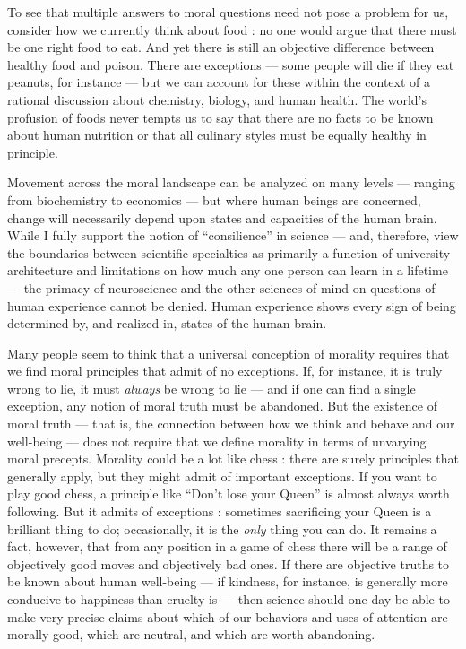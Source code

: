 \documentclass[a4paper,14pt]{extbook}
\begin{document}
To see that multiple answers to moral questions need not pose a problem for us, consider how we currently think about food :
no one would argue that there must be one right food to eat.
And yet there is still an objective difference between healthy food and poison.
There are exceptions --- some people will die if they eat peanuts, for instance --- but we can account for these within the context of a rational discussion about chemistry, biology, and human health.
The world's profusion of foods never tempts us to say that there are no facts to be known about human nutrition or that all culinary styles must be equally healthy in principle.

Movement across the moral landscape can be analyzed on many levels --- ranging from biochemistry to economics --- but where human beings are concerned, change will necessarily depend upon states and capacities of the human brain.
While I fully support the notion of ``consilience'' in science --- and, therefore, view the boundaries between scientific specialties as primarily a function of university architecture and limitations on how much any one person can learn in a lifetime --- the primacy of neuroscience and the other sciences of mind on questions of human experience cannot be denied.
Human experience shows every sign of being determined by, and realized in, states of the human brain.

Many people seem to think that a universal conception of morality requires that we find moral principles that admit of no exceptions.
If, for instance, it is truly wrong to lie, it must \textit{always} be wrong to lie --- and if one can find a single exception, any notion of moral truth must be abandoned.
But the existence of moral truth --- that is, the connection between how we think and behave and our well-being --- does not require that we define morality in terms of unvarying moral precepts.
Morality could be a lot like chess :
there are surely principles that generally apply, but they might admit of important exceptions.
If you want to play good chess, a principle like ``Don't lose your Queen'' is almost always worth following.
But it admits of exceptions :
sometimes sacrificing your Queen is a brilliant thing to do;
occasionally, it is the \textit{only} thing you can do.
It remains a fact, however, that from any position in a game of chess there will be a range of objectively good moves and objectively bad ones.
If there are objective truths to be known about human well-being --- if kindness, for instance, is generally more conducive to happiness than cruelty is --- then science should one day be able to make very precise claims about which of our behaviors and uses of attention are morally good, which are neutral, and which are worth abandoning.
\end{document}
